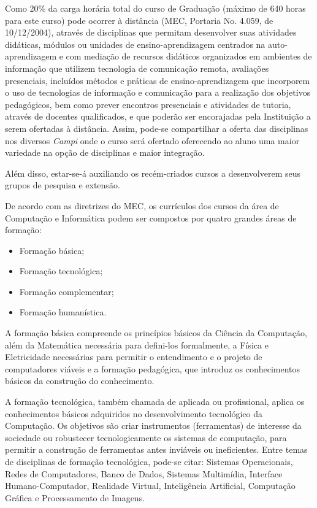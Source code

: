 \documentclass[
	12pt,				%
	openright,			%
  oneside,     %
	a4paper,			%
	english,			%
	french,				%
	spanish,			%
	brazil				%
	]{abntex2}
\begin{document}
Como 20\% da carga horária total do curso de Graduação  (máximo de 640 horas para este curso)  pode ocorrer à distância (MEC, Portaria No. 4.059, de 10/12/2004), através de  disciplinas que permitam desenvolver suas atividades didáticas, módulos ou unidades de ensino-aprendizagem centrados na auto-aprendizagem e com mediação de recursos didáticos organizados em ambientes de informação que utilizem tecnologia de comunicação remota, avaliações presenciais, incluídos métodos e práticas de ensino-aprendizagem que incorporem o uso de tecnologias de informação e comunicação para a realização dos objetivos pedagógicos, bem como prever encontros presenciais e atividades de tutoria, através de docentes qualificados, e que poderão ser encorajadas pela Instituição a serem ofertadas à distância. Assim, pode-se compartilhar a oferta das disciplinas nos diversos \textit{Campi} onde o curso será ofertado oferecendo ao aluno uma maior variedade na opção de disciplinas e maior integração. 

Além disso, estar-se-á auxiliando os recém-criados cursos a desenvolverem seus grupos de pesquisa e extensão.

De acordo com as diretrizes do MEC, os currículos dos cursos da área de Computação e Informática podem ser compostos por quatro grandes áreas de formação:

\begin{itemize}
  \item Formação básica;
  \item Formação tecnológica;
  \item Formação complementar;
  \item Formação humanística.
\end{itemize}

A formação básica compreende os princípios básicos da Ciência da Computação, além da Matemática necessária para defini-los formalmente, a Física e Eletricidade necessárias para permitir o entendimento e o projeto de computadores viáveis e a formação pedagógica, que introduz os conhecimentos básicos da construção do conhecimento. 

A formação tecnológica, também chamada de aplicada ou profissional, aplica os conhecimentos básicos adquiridos no desenvolvimento tecnológico da Computação. Os objetivos são criar instrumentos (ferramentas) de interesse da sociedade ou robustecer tecnologicamente os sistemas de computação, para permitir a construção de ferramentas antes inviáveis ou ineficientes. Entre temas de disciplinas de formação tecnológica, pode-se citar: Sistemas Operacionais, Redes de Computadores, Banco de Dados, Sistemas Multimídia, Interface Humano-Computador, Realidade Virtual, Inteligência Artificial, Computação Gráfica e Processamento de Imagens.
\end{document}
